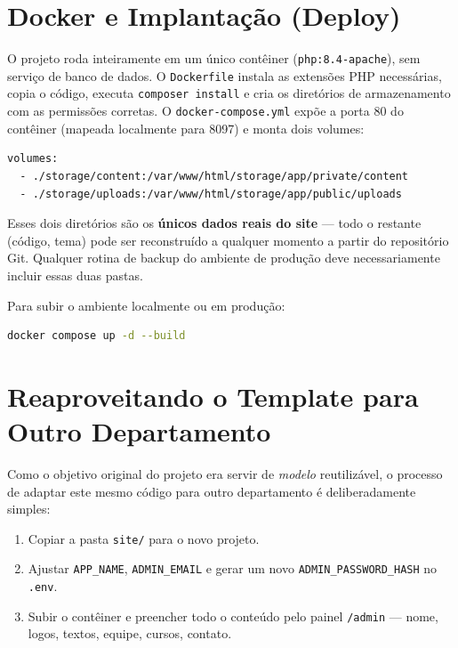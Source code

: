 \documentclass[11pt,a4paper]{article}
\begin{document}
\section{Docker e Implantação (Deploy)}

O projeto roda inteiramente em um único contêiner (\texttt{php:8.4-apache}), sem serviço de
banco de dados. O \texttt{Dockerfile} instala as extensões PHP necessárias, copia o código,
executa \texttt{composer install} e cria os diretórios de armazenamento com as permissões
corretas. O \texttt{docker-compose.yml} expõe a porta 80 do contêiner (mapeada localmente para
8097) e monta dois volumes:

\begin{lstlisting}[caption={Volumes definidos em docker-compose.yml}]
volumes:
  - ./storage/content:/var/www/html/storage/app/private/content
  - ./storage/uploads:/var/www/html/storage/app/public/uploads
\end{lstlisting}

Esses dois diretórios são os \textbf{únicos dados reais do site} — todo o restante (código,
tema) pode ser reconstruído a qualquer momento a partir do repositório Git. Qualquer rotina de
backup do ambiente de produção deve necessariamente incluir essas duas pastas.

Para subir o ambiente localmente ou em produção:

\begin{lstlisting}[language=bash]
docker compose up -d --build
\end{lstlisting}

\section{Reaproveitando o Template para Outro Departamento}

Como o objetivo original do projeto era servir de \emph{modelo} reutilizável, o processo de
adaptar este mesmo código para outro departamento é deliberadamente simples:

\begin{enumerate}[leftmargin=2em]
    \item Copiar a pasta \texttt{site/} para o novo projeto.
    \item Ajustar \texttt{APP\_NAME}, \texttt{ADMIN\_EMAIL} e gerar um novo
          \texttt{ADMIN\_PASSWORD\_HASH} no \texttt{.env}.
    \item Subir o contêiner e preencher todo o conteúdo pelo painel \texttt{/admin} — nome,
          logos, textos, equipe, cursos, contato.
\end{enumerate}
\end{document}

